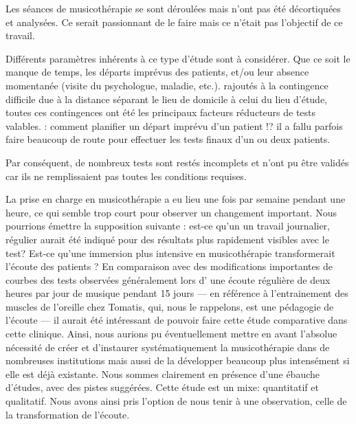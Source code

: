 Les séances de musicothérapie se sont déroulées mais  n'ont pas été
décortiquées et analysées. Ce serait passionnant de le faire mais ce n'était pas l'objectif de ce travail.		
        
 

Différents paramètres inhérents à ce type d'étude sont à
considérer. Que ce soit le manque de temps, les départs imprévus des patients, et/ou leur
absence momentanée (visite du psychologue, maladie, etc.). rajoutés à la
contingence difficile due à la distance séparant le lieu de domicile à
celui du lieu d'étude, toutes ces contingences ont été les principaux facteurs réducteurs de
tests valables.
: comment planifier un départ imprévu d'un patient !? il a fallu parfois
faire beaucoup de route pour effectuer les tests finaux d'un ou deux
patients.
  
Par conséquent,  de nombreux tests sont restés 
incomplets et n'ont pu
être validés car ils ne remplissaient pas toutes les conditions requises. 
 
 La prise en charge en musicothérapie a eu lieu
  une fois par semaine pendant une heure, ce qui semble trop court pour observer un changement important. Nous pourrions émettre la supposition suivante :  est-ce qu'un un travail journalier, régulier aurait été indiqué pour des résultats plus rapidement visibles avec le test?
  Est-ce qu'une immersion plus intensive en musicothérapie transformerait l'écoute des patients ? 
   En comparaison avec des
  modifications importantes de courbes des tests observées généralement  lors d' une écoute
  régulière de deux heures par jour de musique pendant 15 jours --- en référence à l'entrainement des muscles de l'oreille chez Tomatis, qui, nous le rappelons, est une pédagogie de l'écoute --- il aurait été intéressant de pouvoir faire cette étude comparative dans cette clinique. Ainsi, nous aurions pu éventuellement mettre en avant  l'absolue nécessité de créer et d'instaurer systématiquement la musicothérapie dans de nombreuses institutions mais aussi  de la développer beaucoup plus intensément  si elle est déjà existante.
  Nous sommes clairement en présence d'une ébauche d'études, avec des pistes
  suggérées. 
  Cette étude est un mixe: quantitatif et qualitatif. Nous avons ainsi pris l'option de nous tenir à une
  observation, celle de la transformation de l'écoute.
  



  

